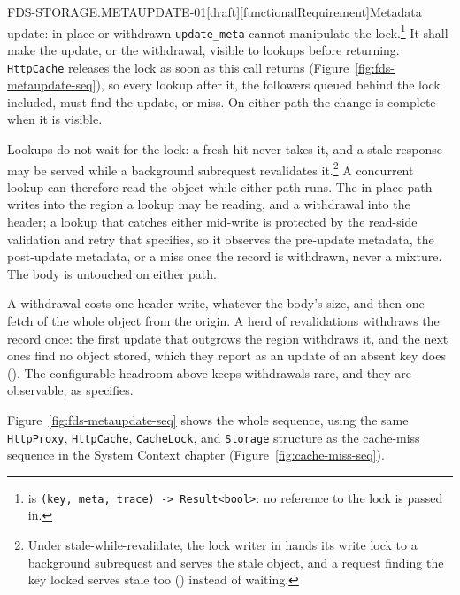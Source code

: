 \begin{requirement}{FDS-STORAGE.METAUPDATE-01}[draft][functionalRequirement]{Metadata update: in place or withdrawn}
  \texttt{update\_meta} cannot manipulate the lock.\footnote{
  is \texttt{(key, meta, trace) -> Result<bool>}: no reference to the
  lock is passed in.} It shall make the update, or the withdrawal, visible
  to lookups before returning. \texttt{HttpCache} releases the lock as soon
  as this call returns (Figure~\ref{fig:fds-metaupdate-seq}), so every
  lookup after it, the followers queued behind the lock included, must find
  the update, or miss. On either path the change is complete when it is
  visible.

  Lookups do not wait for the lock: a fresh hit never takes it, and a
  stale response may be served while a background subrequest revalidates
  it.\footnote{Under stale-while-revalidate, the lock writer in
  hands its write lock to a background subrequest and serves the stale
  object, and a request finding the key locked serves stale too
  () instead of
  waiting.} A
  concurrent lookup can therefore read the object while either path runs.
  The in-place path writes into the region a lookup may be reading, and a
  withdrawal into the header; a lookup that catches either mid-write is
  protected by the read-side validation and retry that
   specifies, so it observes the
  pre-update metadata, the post-update metadata, or a miss once the record
  is withdrawn, never a mixture. The body is untouched on either path.

  A withdrawal costs one header write, whatever the body's size, and then
  one fetch of the whole object from the origin. A herd of revalidations
  withdraws the record once: the first update that outgrows the region
  withdraws it, and the next ones find no object stored, which they report
  as an update of an absent key does ().
  The configurable headroom above keeps withdrawals rare, and they are
  observable, as  specifies.

  Figure~\ref{fig:fds-metaupdate-seq} shows the whole sequence, using the
  same \texttt{HttpProxy}, \texttt{HttpCache}, \texttt{CacheLock}, and
  \texttt{Storage} structure as the cache-miss sequence in the System
  Context chapter (Figure~\ref{fig:cache-miss-seq}).


\end{requirement}
